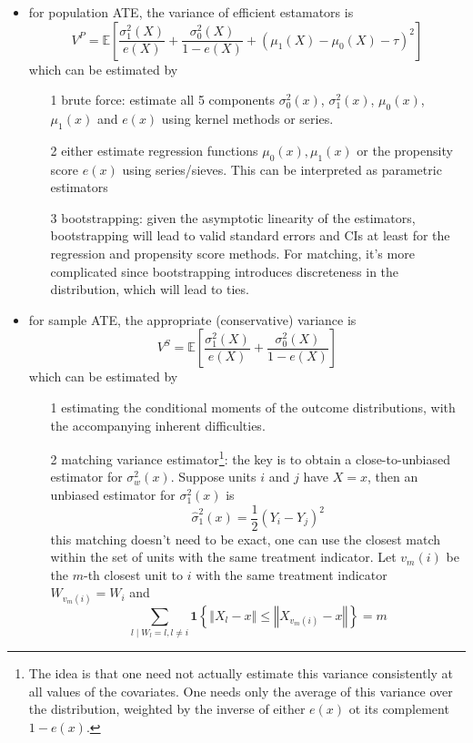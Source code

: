 \documentclass[twoside]{article}
\begin{document}
\begin{itemize}
    \item for population ATE, the variance of efficient estamators is $$ V^P = \mathbb{E} \left[ \frac{\sigma^2_1(X)}{e(X)} + \frac{\sigma^2_0(X)}{1-e(X)} + \left(\mu_1(X)-\mu_0(X)-\tau\right)^2 \right] $$
    which can be estimated by
    \begin{itemize}
        \item[1] brute force: estimate all 5 components $\sigma^2_0(x)$, $\sigma^2_1(x)$, $\mu_0(x)$, $\mu_1(x)$ and $e(x)$ using kernel methods or series.
        \item[2] either estimate regression functions $\mu_0(x),\mu_1(x)$ or the propensity score $e(x)$ using series/sieves. This can be interpreted as parametric estimators
        \item[3] bootstrapping: given the asymptotic linearity of the estimators, bootstrapping will lead to valid standard errors and CIs at least for the regression and propensity score methods. For matching, it's more complicated since bootstrapping introduces discreteness in the distribution, which will lead to ties.
    \end{itemize}
    \item for sample ATE, the appropriate (conservative) variance is $$ V^S = \mathbb{E}\left[\frac{\sigma^2_1(X)}{e(X)} + \frac{\sigma^2_0(X)}{1-e(X)}\right] $$
    which can be estimated by 
    \begin{itemize}
        \item[1] estimating the conditional moments of the outcome distributions, with the accompanying inherent difficulties.
        \item[2] matching variance estimator\footnote{The idea is that one need not actually estimate this variance consistently at all values of the covariates. One needs only the average of this variance over the distribution, weighted by the inverse of either $e(x)$ ot its complement $1-e(x)$.}: the key is to obtain a close-to-unbiased estimator for $\sigma^2_w(x)$. Suppose units $i$ and $j$ have $X=x$, then an unbiased estimator for $\sigma^2_1(x)$ is $$ \hat{\sigma}^2_1(x) = \frac{1}{2}(Y_i-Y_j)^2 $$
        this matching doesn't need to be exact, one can use the closest match within the set of units with the same treatment indicator. Let $v_m(i)$ be the $m$-th closest unit to $i$ with the same treatment indicator $W_{v_m(i)}=W_i$ and 
        $$
        \sum_{l\mid W_l=l,l\neq i} \mathbf{1} \left\{ \left\Vert X_l-x \right\Vert \leq \left\Vert X_{v_m(i)}-x \right\Vert \right\} = m
$$
\end{itemize}
\end{itemize}
\end{document}
